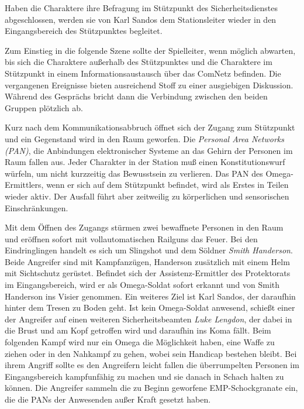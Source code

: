 
Haben die Charaktere ihre Befragung im Stützpunkt des Sicherheitsdienstes abgeschlossen, werden sie von Karl Sandos dem Stationsleiter wieder in den Eingangsbereich des Stützpunktes begleitet. 

Zum Einstieg in die folgende Szene sollte der Spielleiter, wenn möglich abwarten, bis sich die Charaktere außerhalb des Stützpunktes und die Charaktere im Stützpunkt in einem Informationsaustausch über das ComNetz befinden. Die vergangenen Ereignisse bieten ausreichend Stoff zu einer ausgiebigen Diskussion. Während des Gesprächs bricht dann die Verbindung zwischen den beiden Gruppen plötzlich ab. 


Kurz nach dem Kommunikationsabbruch öffnet sich der Zugang zum Stützpunkt und ein Gegenstand wird in den Raum geworfen. Die \emph{Personal Area Networks (PAN)}, die Anbindungen elektronischer Systeme an das Gehirn der Personen im Raum fallen aus. Jeder Charakter in der Station muß einen Konstitutionswurf würfeln, um nicht kurzzeitig das Bewusstsein zu verlieren. Das PAN des Omega-Ermittlers, wenn er sich auf dem Stützpunkt befindet, wird als Erstes in Teilen wieder aktiv. Der Ausfall führt aber zeitweilig zu körperlichen und sensorischen Einschränkungen.

Mit dem Öffnen des Zugangs stürmen zwei bewaffnete Personen in den Raum und eröffnen sofort mit vollautomatischen Railguns das Feuer. Bei den Eindringlingen handelt es sich um Slingshot und dem Söldner \emph{Smith Handerson}. Beide Angreifer sind mit Kampfanzügen, Handerson zusätzlich mit einem Helm mit Sichtschutz gerüstet. Befindet sich der Assistenz-Ermittler des Protektorats im Eingangsbereich, wird er als Omega-Soldat sofort erkannt und von Smith Handerson ins Visier genommen. Ein weiteres Ziel ist Karl Sandos, der daraufhin hinter dem Tresen zu Boden geht. Ist kein Omega-Soldat anwesend, schießt einer der Angreifer auf einen weiteren Sicherheitsbeamten \emph{Luke Lengdon}, der dabei in die Brust und am Kopf getroffen wird und daraufhin ins Koma fällt. Beim folgenden Kampf wird nur ein Omega die Möglichkeit haben, eine Waffe zu ziehen oder in den Nahkampf zu gehen, wobei sein Handicap bestehen bleibt. Bei ihrem Angriff sollte es den Angreifern leicht fallen die überrumpelten Personen im Eingangsbereich kampfunfähig zu machen und sie danach in Schach halten zu können. Die Angreifer sammeln die zu Beginn geworfene EMP-Schockgranate ein, die die PANs der Anwesenden außer Kraft gesetzt haben.

